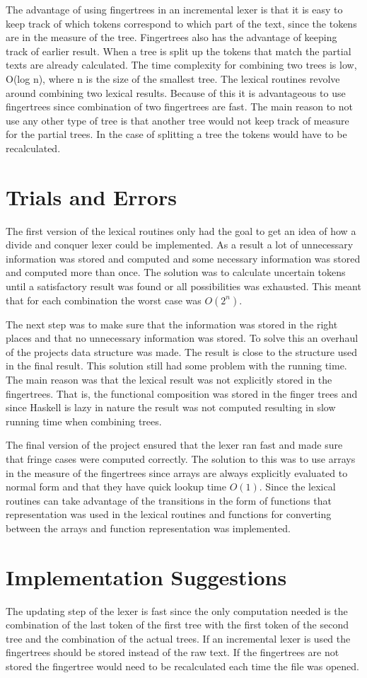 The advantage of using fingertrees in an incremental lexer is that it is easy
to keep track of which tokens correspond to which part of the text, since the
tokens are in the measure of the tree. Fingertrees
also has the advantage of keeping track of earlier result. When a tree is split
up the tokens that match the partial texts are already calculated. The time
complexity for combining two trees is low, O(log n), where n is the size of the
smallest tree. The lexical routines revolve around combining two lexical
results. Because of this it is advantageous to use fingertrees since combination
of two fingertrees are fast. The main reason to not use any other type of tree
is that another tree would not keep track of measure for the partial trees. In
the case of splitting a tree the tokens would have to be recalculated.

\section{Trials and Errors}
The first version of the lexical routines only had the goal to get an idea of
how a divide and conquer lexer could be implemented. As a result a lot of
unnecessary information was stored and computed and some necessary information
was stored and computed more than once. The solution was to calculate
uncertain tokens until a satisfactory result was found or all possibilities was
exhausted. This meant that for each combination the worst case was $O(2^n)$.

The next step was to make sure that the information was stored in the right
places and that no unnecessary information was stored. To solve this an overhaul
of the projects data structure was made. The result is close to the structure
used in the final result. This solution still had some problem with the running
time. The main reason was that the lexical result was not explicitly stored in
the fingertrees. That is, the functional composition was stored in the finger
trees and since Haskell is lazy in nature the result was not computed resulting
in slow running time when combining trees.

The final version of the project ensured that the lexer ran fast and made
sure that fringe cases were computed correctly. The solution to this was to use
arrays in the measure of the fingertrees since arrays are always explicitly
evaluated to normal form and that they have quick lookup time $O(1)$. Since the
lexical routines can take advantage of the transitions in the form of functions
that representation was used in the lexical routines and functions for
converting between the arrays and function representation was implemented.

\section{Implementation Suggestions}
The updating step of the lexer is fast since the only computation needed is the
combination of the last token of the first tree with the first token of the
second tree and the combination of the actual trees. If an incremental lexer is
used the fingertrees should be stored instead of the raw text. If the
fingertrees are not stored the fingertree would need to be recalculated each
time the file was opened.
